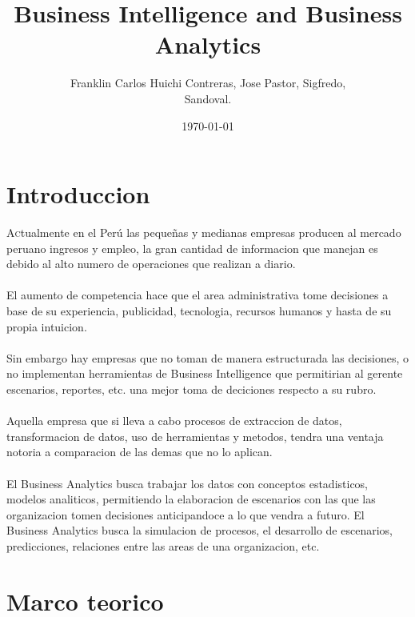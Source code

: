 \documentclass[twoside,twocolumn]{article}
\title{Business Intelligence and Business Analytics}
\author{Franklin Carlos Huichi Contreras, Jose Pastor, Sigfredo, \\
 Sandoval. }
\date{\today}
\begin{document}
\maketitle


\section{Introduccion}
\lettrine[nindent=0em,lines=3]{A}ctualmente en el Perú las pequeñas y medianas empresas producen al mercado peruano ingresos y empleo, la gran cantidad de informacion que manejan es debido al alto numero de operaciones que realizan a diario.\\ \\
El aumento de competencia hace que el area administrativa tome decisiones a base de su experiencia, publicidad, tecnologia, recursos humanos y hasta de su propia intuicion.\\ \\
Sin embargo hay empresas que no toman de manera estructurada las decisiones, o no implementan herramientas de Business Intelligence que permitirian al gerente escenarios, reportes, etc. una mejor toma de deciciones respecto a su rubro. \\ \\
Aquella empresa que si lleva a cabo procesos de extraccion de datos, transformacion de datos, uso de herramientas y metodos, tendra una ventaja notoria a comparacion de las demas que no lo aplican.
\\ \\
El Business Analytics busca trabajar los datos con conceptos estadisticos, modelos analiticos, permitiendo la elaboracion de escenarios con las que las organizacion tomen decisiones anticipandoce a lo que vendra a futuro. El Business Analytics busca la simulacion de procesos, el desarrollo de escenarios, predicciones, relaciones entre las areas de una organizacion, etc.




\section{Marco teorico}
\end{document}
